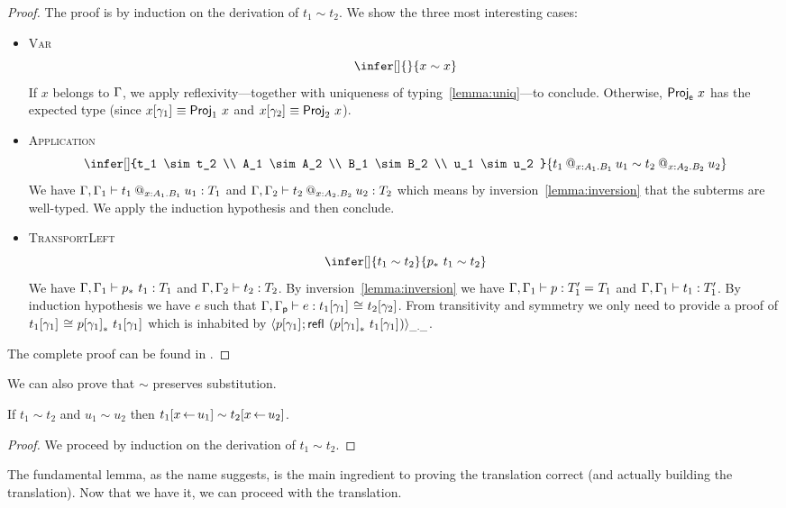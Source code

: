 \begin{proof}
  The proof is by induction on the derivation of $t_1 \sim t_2$. We show
  the three most interesting cases:

  \begin{itemize}
  \item \textsc{Var}
    \[
      \infer[]
        { }
        {x \sim x}
    \]
    If $x$ belongs to $\Ga$, we apply reflexivity---together with uniqueness of
    typing~\eqref{lemma:uniq}---to conclude.
    Otherwise, $\ProjE{x}$ has the expected type (since
    $\llift{\gamma}{}{x} \equiv \ProjO{x}$ and $\rlift{\gamma}{}{x} \equiv \ProjT{x}$).

  \item \textsc{Application}
    \[
      \infer[]
        {t_1 \sim t_2 \\
         A_1 \sim A_2 \\
         B_1 \sim B_2 \\
         u_1 \sim u_2
        }
        {\app{t_1}{x:A_1}{B_1}{u_1} \sim \app{t_2}{x:A_2}{B_2}{u_2}}
    \]
    We have $\isterm{\Ga, \Ga_1}{\app{t_1}{x:A_1}{B_1}{u_1}}{T_1}$ and
    $\isterm{\Ga, \Ga_2}{\app{t_2}{x:A_2}{B_2}{u_2}}{T_2}$ which means by
    inversion~\eqref{lemma:inversion} that the subterms are well-typed.
    We apply the induction hypothesis and then conclude.
  \item \textsc{TransportLeft}
    \[
      \infer[]
        {t_1 \sim t_2}
        {\transpo{p}\ t_1 \sim t_2}
    \]
    We have $\isterm{\Ga, \Ga_1}{\transpo{p}\ t_1}{T_1}$ and
    $\isterm{\Ga, \Ga_2}{t_2}{T_2}$.
    By inversion~\eqref{lemma:inversion} we have
    $\isterm{\Ga, \Ga_1}{p}{\Eq{}{T_1'}{T_1}}$ and
    $\isterm{\Ga, \Ga_1}{t_1}{T_1'}$.
    By induction hypothesis we have $e$ such that
    $\isterm{\Ga, \Gp}{e}{\Heq{}{\llift{\gamma}{}{t_1}}{}{\rlift{\gamma}{}{t_2}}}$.
    From transitivity and symmetry we only need to provide a proof of
    $\Heq{}{\llift{\gamma}{}{t_1}}{}{\transpo{\llift{\gamma}{}{p}}\ \llift{\gamma}{}{t_1}}$ which is inhabited by
    $\pair{\_}{\_}{\llift{\gamma}{}{p}}{\refl{} (\transpo{\llift{\gamma}{}{p}}\ \llift{\gamma}{}{t_1})}$.
  \end{itemize}

  The complete proof can be found in .
\end{proof}

We can also prove that $\sim$ preserves substitution.

\begin{lemma}
  If $t_1 \sim t_2$ and $u_1 \sim u_2$ then
  $t_1[x \sto u_1] \sim t_2[x \sto u_2]$.
\end{lemma}

\begin{proof}
  We proceed by induction on the derivation of $t_1 \sim t_2$.
\end{proof}

The fundamental lemma, as the name suggests, is the main ingredient to proving
the translation correct (and actually building the translation). Now that we
have it, we can proceed with the translation.